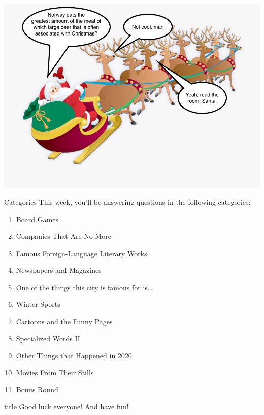 \documentclass[11pt]{beamer}
\begin{document}
\begin{frame}
    \includegraphics[max width=.95\textwidth,
        max height=.95\textheight]{Images/santasleigh.png}
\end{frame}

\begingroup{}
\begingroup{}
\begin{frame}[t]{Categories}
    This week, you'll be answering questions in the following categories:
    \begin{enumerate}
        \item Board Games
        \item Companies That Are No More
        \item Famous Foreign-Language Literary Works
        \item Newspapers and Magazines
        \item One of the things this city is famous for is\ldots
        \item Winter Sports
        \item Cartoons and the Funny Pages
        \item Specialized Words II
        \item Other Things that Happened in 2020
        \item Movies From Their Stills
        \item Bonus Round
    \end{enumerate}
\end{frame}
\endgroup{}

\begingroup{}
\begin{frame}
    \vfill{}
    \begin{beamercolorbox}[sep=8pt,center,shadow=true,rounded=true]{title}
        Good luck everyone! And have fun!
    \end{beamercolorbox}
    \vfill{}
\end{frame}
\endgroup{}
\def\thisSectionName{Board Games}
\end{document}
